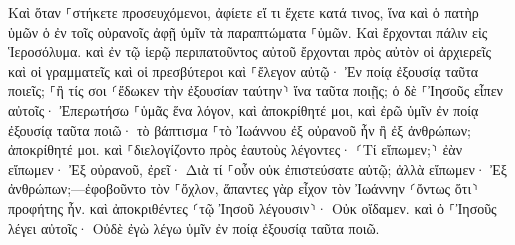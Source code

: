 \documentclass[twoside, 9pt]{extreport}
\begin{document}
Καὶ ὅταν ⸀στήκετε προσευχόμενοι, ἀφίετε εἴ τι ἔχετε κατά τινος, ἵνα καὶ ὁ πατὴρ ὑμῶν ὁ ἐν τοῖς οὐρανοῖς ἀφῇ ὑμῖν τὰ παραπτώματα ⸀ὑμῶν. 
Καὶ ἔρχονται πάλιν εἰς Ἱεροσόλυμα. καὶ ἐν τῷ ἱερῷ περιπατοῦντος αὐτοῦ ἔρχονται πρὸς αὐτὸν οἱ ἀρχιερεῖς καὶ οἱ γραμματεῖς καὶ οἱ πρεσβύτεροι 
καὶ ⸀ἔλεγον αὐτῷ· Ἐν ποίᾳ ἐξουσίᾳ ταῦτα ποιεῖς; ⸀ἢ τίς σοι ⸂ἔδωκεν τὴν ἐξουσίαν ταύτην⸃ ἵνα ταῦτα ποιῇς; 
ὁ δὲ ⸀Ἰησοῦς εἶπεν αὐτοῖς· Ἐπερωτήσω ⸀ὑμᾶς ἕνα λόγον, καὶ ἀποκρίθητέ μοι, καὶ ἐρῶ ὑμῖν ἐν ποίᾳ ἐξουσίᾳ ταῦτα ποιῶ· 
τὸ βάπτισμα ⸀τὸ Ἰωάννου ἐξ οὐρανοῦ ἦν ἢ ἐξ ἀνθρώπων; ἀποκρίθητέ μοι. 
καὶ ⸀διελογίζοντο πρὸς ἑαυτοὺς λέγοντες· ⸂Τί εἴπωμεν;⸃ ἐὰν εἴπωμεν· Ἐξ οὐρανοῦ, ἐρεῖ· Διὰ τί ⸀οὖν οὐκ ἐπιστεύσατε αὐτῷ; 
ἀλλὰ εἴπωμεν· Ἐξ ἀνθρώπων;—ἐφοβοῦντο τὸν ⸀ὄχλον, ἅπαντες γὰρ εἶχον τὸν Ἰωάννην ⸂ὄντως ὅτι⸃ προφήτης ἦν. 
καὶ ἀποκριθέντες ⸂τῷ Ἰησοῦ λέγουσιν⸃· Οὐκ οἴδαμεν. καὶ ὁ ⸀Ἰησοῦς λέγει αὐτοῖς· Οὐδὲ ἐγὼ λέγω ὑμῖν ἐν ποίᾳ ἐξουσίᾳ ταῦτα ποιῶ. 
\end{document}
